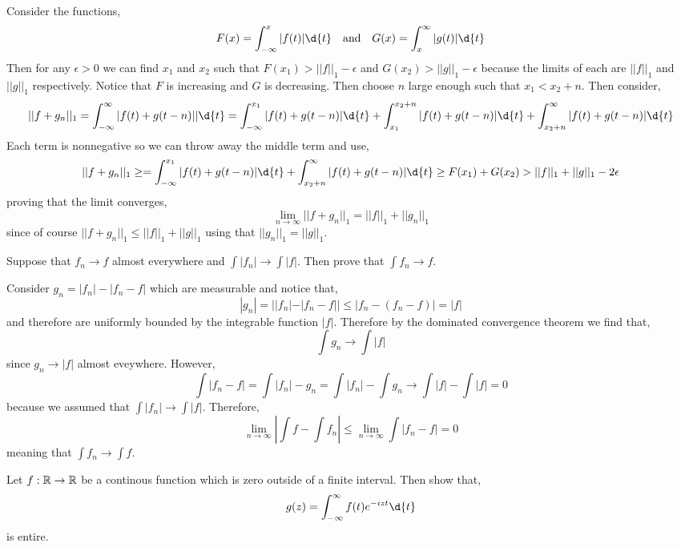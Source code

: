\documentclass[12pt]{article}
\begin{document}
Consider the functions,
\[ F(x) = \int_{-\infty}^x |f(t)| \d{t} \quad \text{and} \quad G(x) = \int^{\infty}_x |g(t)| \d{t} \]
Then for any $\epsilon > 0$ we can find $x_1$ and $x_2$ such that $F(x_1) > ||f||_{1} - \epsilon$ and $G(x_2) > ||g||_{1} - \epsilon$ because the limits of each are $||f||_{1}$ and $||g||_{1}$ respectively. Notice that $F$ is increasing and $G$ is decreasing. Then choose $n$ large enough such that $x_1 < x_2 + n$. Then consider,
\[ ||f + g_n||_{1} = \int_{-\infty}^{\infty} |f(t) + g(t - n)|| \d{t} = \int_{-\infty}^{x_1} |f(t) + g(t - n)| \d{t} + \int_{x_1}^{x_2 + n} | f(t) + g(t - n)| \d{t} + \int_{x_2 + n}^\infty |f(t) + g(t - n) | \d{t} \]
Each term is nonnegative so we can throw away the middle term and use,
\[ || f + g_n ||_{1} \ge = \int_{-\infty}^{x_1} |f(t) + g(t - n)| \d{t}  + \int_{x_2 + n}^\infty |f(t) + g(t - n) | \d{t} \ge F(x_1) + G(x_2) > || f ||_{1} + || g ||_{1} - 2 \epsilon \]
proving that the limit converges,
\[ \lim_{n \to \infty}  ||f  + g_n ||_{1} = || f ||_{1} + || g_n ||_{1} \] since of course $|| f + g_n ||_{1} \le || f ||_{1} + || g ||_{1}$ using that $|| g_n ||_{1} = || g ||_{1}$.


\begin{exercise}
Suppose that $f_n \to f$ almost everywhere and $\int |f_n| \to \int |f|$. Then prove that $\int f_n \to f$.
\end{exercise}

Consider $g_n = |f_n| - |f_n - f|$ which are measurable and notice that,
\[ |g_n| = ||f_n| - |f_n - f|| \le |f_n - (f_n - f)| = |f| \]
and therefore are uniformly bounded by the integrable function $|f|$. Therefore by the dominated convergence theorem we find that,
\[ \int g_n \to \int |f| \]
since $g_n \to |f|$ almost eveywhere. However, 
\[ \int |f_n - f| = \int |f_n| - g_n = \int |f_n| - \int g_n \to \int |f| - \int |f| = 0 \]
because we assumed that $\int |f_n| \to \int |f|$. Therefore, 
\[ \lim_{n \to \infty} \left| \int f - \int f_n \right| \le \lim_{n \to \infty} \int |f_n - f| = 0 \]
meaning that $\int f_n \to \int f$.

\begin{exercise}
Let $f : \mathbb{R} \to \mathbb{R}$ be a continous function which is zero outside of a finite interval. Then show that,
\[ g(z) = \int_{-\infty}^{\infty} f(t) e^{-i z t} \d{t} \]
is entire.
\end{exercise}
\end{document}
